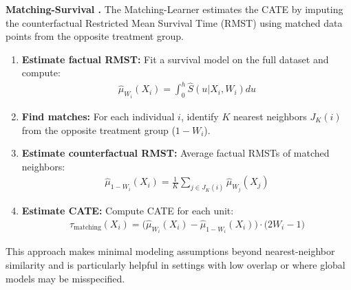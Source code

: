 \textbf{Matching-Survival \citep{noroozizadeh2025impact}.}
The Matching-Learner estimates the CATE by imputing the counterfactual Restricted Mean Survival Time (RMST) using matched data points from the opposite treatment group.

\begin{enumerate}
    \item \textbf{Estimate factual RMST:} Fit a survival model on the full dataset and compute:
    \begin{align*}
        \widehat{\mu}_{W_i}(X_i) = \int_0^h \widehat{S}(u | X_i, W_i) du
    \end{align*}
    \item \textbf{Find matches:} For each individual $i$, identify $K$ nearest neighbors $J_K(i)$ from the opposite treatment group (\(1-W_i\)).
    \item \textbf{Estimate counterfactual RMST:} Average factual RMSTs of matched neighbors:
    \begin{align*}
        \widehat{\mu}_{1-W_i}(X_i) = \frac{1}{K} \sum_{j \in J_K(i)} \widehat{\mu}_{W_j}(X_j)
    \end{align*}
    \item \textbf{Estimate CATE:} Compute CATE for each unit:
    \begin{align*}
        \widehat{\tau}_{\text{matching}}(X_i) = \big(\widehat{\mu}_{W_i}(X_i) - \widehat{\mu}_{1-W_i} (X_i)\big) \cdot \big(2 W_i - 1 \big)
    \end{align*}
\end{enumerate}

This approach makes minimal modeling assumptions beyond nearest-neighbor similarity and is particularly helpful in settings with low overlap or where global models may be misspecified.




